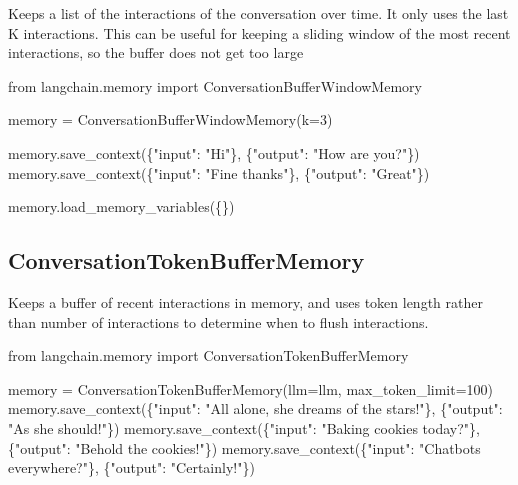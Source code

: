 \documentclass[
  letterpaper,
  DIV=11,
  numbers=noendperiod]{scrreprt}
\newenvironment{Shaded}{\begin{snugshade}}{\end{snugshade}}
\newcommand{\DecValTok}[1]{\textcolor[rgb]{0.68,0.00,0.00}{#1}}
\newcommand{\ImportTok}[1]{\textcolor[rgb]{0.00,0.46,0.62}{#1}}
\newcommand{\NormalTok}[1]{\textcolor[rgb]{0.00,0.23,0.31}{#1}}
\newcommand{\OperatorTok}[1]{\textcolor[rgb]{0.37,0.37,0.37}{#1}}
\newcommand{\StringTok}[1]{\textcolor[rgb]{0.13,0.47,0.30}{#1}}
\begin{document}
Keeps a list of the interactions of the conversation over time. It only
uses the last K interactions. This can be useful for keeping a sliding
window of the most recent interactions, so the buffer does not get too
large

\begin{Shaded}
\begin{Highlighting}[]
\ImportTok{from}\NormalTok{ langchain.memory }\ImportTok{import}\NormalTok{ ConversationBufferWindowMemory}

\NormalTok{memory }\OperatorTok{=}\NormalTok{ ConversationBufferWindowMemory(k}\OperatorTok{=}\DecValTok{3}\NormalTok{)}

\NormalTok{memory.save\_context(\{}\StringTok{"input"}\NormalTok{: }\StringTok{"Hi"}\NormalTok{\},}
\NormalTok{                    \{}\StringTok{"output"}\NormalTok{: }\StringTok{"How are you?"}\NormalTok{\})}
\NormalTok{memory.save\_context(\{}\StringTok{"input"}\NormalTok{: }\StringTok{"Fine thanks"}\NormalTok{\},}
\NormalTok{                    \{}\StringTok{"output"}\NormalTok{: }\StringTok{"Great"}\NormalTok{\})}

\NormalTok{memory.load\_memory\_variables(\{\})}
\end{Highlighting}
\end{Shaded}

\hypertarget{conversationtokenbuffermemory}{%
\subsection{ConversationTokenBufferMemory}\label{conversationtokenbuffermemory}}

Keeps a buffer of recent interactions in memory, and uses token length
rather than number of interactions to determine when to flush
interactions.

\begin{Shaded}
\begin{Highlighting}[]
\ImportTok{from}\NormalTok{ langchain.memory }\ImportTok{import}\NormalTok{ ConversationTokenBufferMemory}

\NormalTok{memory }\OperatorTok{=}\NormalTok{ ConversationTokenBufferMemory(llm}\OperatorTok{=}\NormalTok{llm, max\_token\_limit}\OperatorTok{=}\DecValTok{100}\NormalTok{)}
\NormalTok{memory.save\_context(\{}\StringTok{"input"}\NormalTok{: }\StringTok{"All alone, she dreams of the stars!"}\NormalTok{\},}
\NormalTok{                    \{}\StringTok{"output"}\NormalTok{: }\StringTok{"As she should!"}\NormalTok{\})}
\NormalTok{memory.save\_context(\{}\StringTok{"input"}\NormalTok{: }\StringTok{"Baking cookies today?"}\NormalTok{\},}
\NormalTok{                    \{}\StringTok{"output"}\NormalTok{: }\StringTok{"Behold the cookies!"}\NormalTok{\})}
\NormalTok{memory.save\_context(\{}\StringTok{"input"}\NormalTok{: }\StringTok{"Chatbots everywhere?"}\NormalTok{\},}
\NormalTok{                    \{}\StringTok{"output"}\NormalTok{: }\StringTok{"Certainly!"}\NormalTok{\})}
\end{Highlighting}
\end{Shaded}
\end{document}
